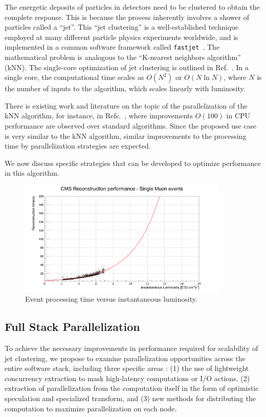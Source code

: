 \documentclass[12pt]{article}
\begin{document}
The energetic deposits of particles in detectors need to be clustered
to obtain the
complete response. This is because the process
inherently involves a shower of particles called a ``jet''. This
``jet clustering'' is a well-established technique employed at
many different particle physics experiments worldwide, and is
implemented in a common software framework called 
{\tt fastjet}~\cite{fastjet_manual}. 
The mathematical problem is analogous to the
``K-nearest neighbors algorithm''~\cite{knn_ieee} (kNN). 
The single-core optimization of
jet clustering
is outlined in Ref.~\cite{fastjet_timing}. In a single core,
the computational time scales as $O(N^2)$ or  $O(N \ln{N})$, where $N$
is the number of inputs to the algorithm, which scales linearly with
luminosity. 

There is existing work and literature on the topic of the
parallelization of the kNN algorithm, for instance, in
Refs.~\cite{knn_gpu_1, knn_gpu_2, knn_gpu_3}, where improvements
$O(100)$ in CPU performance are observed over standard
algorithms. Since the proposed use case is
very similar to the kNN algorithm, similar improvements to the
processing time by parallelization strategies are expected. 

We now discuss specific strategies that can be developed 
to optimize performance in this algorithm. 

\begin{figure}[h!]
    \centering
    \includegraphics[width=100mm]{lumitpeSingleMu-fitted2.png}
    \caption{\label{lumitpeSingleMu} Event processing time versus
      instantaneous luminosity.}
\end{figure}



\subsection{Full Stack Parallelization}

To achieve the necessary improvements in performance required for scalability
of jet clustering, we propose to examine parallelization opportunities across
the entire software stack, including three specific areas : 
(1) the use of lightweight concurrency
extraction to mask high-latency computations or I/O actions, 
(2) extraction of
parallelization from the computation itself in the form of optimistic speculation
and specialized transform, and
(3) new methods for distributing the computation to
maximize parallelization on each node. 
\end{document}
